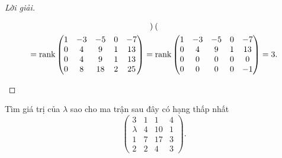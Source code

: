 \documentclass[class=linear-algebra,crop=false]{standalone}
\begin{document}
\begin{proof}[Lời giải]
\begin{enumerate}[label = (\alph*)]
\begin{gather*}
\begin{pmatrix}
			      \end{pmatrix} \\
			      =\text{rank}\begin{pmatrix}
				      1 & -3 & -5 & 0 & -7 \\
				      0 & 4  & 9  & 1 & 13 \\
				      0 & 4  & 9  & 1 & 13 \\
				      0 & 8  & 18 & 2 & 25
			      \end{pmatrix}
			      =\text{rank}\begin{pmatrix}
				      1 & -3 & -5 & 0 & -7 \\
				      0 & 4  & 9  & 1 & 13 \\
				      0 & 0  & 0  & 0 & 0  \\
				      0 & 0  & 0  & 0 & -1
			      \end{pmatrix}
			      = 3.
		      \end{gather*}
		      \endgroup{}
	\end{enumerate}
\end{proof}

\begin{exercise}
	\par Tìm giá trị của $\lambda$ sao cho ma trận sau đây có hạng thấp nhất
	\[
		\begin{pmatrix}
			3       & 1 & 1  & 4 \\
			\lambda & 4 & 10 & 1 \\
			1       & 7 & 17 & 3 \\
			2       & 2 & 4  & 3
		\end{pmatrix}.
	\]
\end{exercise}
\end{document}
